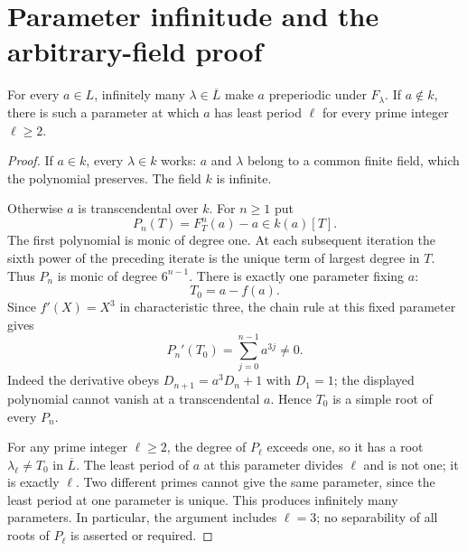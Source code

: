 \section{Parameter infinitude and the arbitrary-field proof}\label{sec:proof}

\begin{lemma}\label{lem:onepoint}
For every $a\in L$, infinitely many $\lambda\in\overline L$ make
$a$ preperiodic under $F_\lambda$. If $a\notin k$, there is such
a parameter at which $a$ has least period $\ell$ for every prime
integer $\ell\ge2$.
\end{lemma}

\begin{proof}
If $a\in k$, every $\lambda\in k$ works: $a$ and $\lambda$
belong to a common finite field, which the polynomial preserves.
The field $k$ is infinite.

Otherwise $a$ is transcendental over $k$. For $n\ge1$ put
\[
 P_n(T)=F_T^n(a)-a\in k(a)[T].
\]
The first polynomial is monic of degree one. At each subsequent
iteration the sixth power of the preceding iterate is the unique
term of largest degree in $T$. Thus $P_n$ is monic of degree
$6^{n-1}$. There is exactly one parameter fixing $a$:
\[
 T_0=a-f(a).
\]
Since $f'(X)=X^3$ in characteristic three, the chain rule at this
fixed parameter gives
\begin{equation}\label{eq:simple}
 P_n'(T_0)=\sum_{j=0}^{n-1}a^{3j}\ne0.
\end{equation}
Indeed the derivative obeys $D_{n+1}=a^3D_n+1$ with $D_1=1$;
the displayed polynomial cannot vanish at a transcendental $a$.
Hence $T_0$ is a simple root of every $P_n$.

For any prime integer $\ell\ge2$, the degree of $P_\ell$ exceeds
one, so it has a root $\lambda_\ell\ne T_0$ in $\overline L$.
The least period of $a$ at this parameter divides $\ell$ and is
not one; it is exactly $\ell$. Two different primes cannot give
the same parameter, since the least period at one parameter is
unique. This produces infinitely many parameters. In particular,
the argument includes $\ell=3$; no separability of all roots of
$P_\ell$ is asserted or required.
\end{proof}


